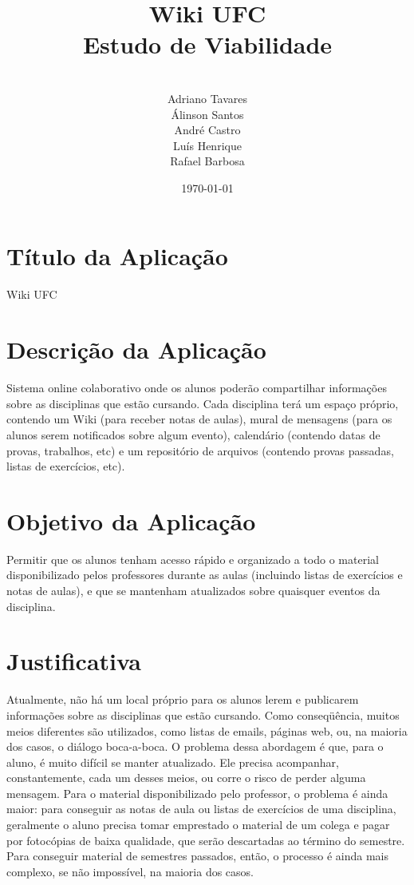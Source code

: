 \documentclass[11pt]{article}
\title{\vspace{8em} \huge{Wiki UFC} \\ \vspace{0.1em} \small{Estudo de Viabilidade}}
\author{
        \vspace{5em} \\
        \small{Adriano Tavares} \\
        \small{Álinson Santos}  \\
        \small{André Castro}    \\
        \small{Luís Henrique}   \\
        \small{Rafael Barbosa}
}
\date{\today}
\begin{document}
\maketitle
\pagebreak

\tableofcontents
\pagebreak

\section{Título da Aplicação}

Wiki UFC

\section{Descrição da Aplicação}

Sistema online colaborativo onde os alunos poderão compartilhar informações sobre
as disciplinas que estão cursando. Cada disciplina terá um espaço próprio, contendo
um Wiki (para receber notas de aulas), mural de mensagens (para os alunos serem
notificados sobre algum evento), calendário (contendo datas de provas, trabalhos, etc)
e um repositório de arquivos (contendo provas passadas, listas de exercícios, etc).



\section{Objetivo da Aplicação}

Permitir que os alunos tenham acesso rápido e organizado a todo o material
disponibilizado pelos professores durante as aulas (incluindo listas de exercícios e
notas de aulas), e que se mantenham atualizados sobre quaisquer eventos da
disciplina.



\section{Justificativa}

Atualmente, não há um local próprio para os alunos lerem e publicarem informações
sobre as disciplinas que estão cursando. Como conseqüência, muitos meios diferentes
são utilizados, como listas de emails, páginas web, ou, na maioria dos casos, o diálogo
boca-a-boca. O problema dessa abordagem é que, para o aluno, é muito difícil se
manter atualizado. Ele precisa acompanhar, constantemente, cada um desses meios,
ou corre o risco de perder alguma mensagem.
Para o material disponibilizado pelo professor, o problema é ainda maior: para
conseguir as notas de aula ou listas de exercícios de uma disciplina, geralmente o
aluno precisa tomar emprestado o material de um colega e pagar por fotocópias de
baixa qualidade, que serão descartadas ao término do semestre. Para conseguir
material de semestres passados, então, o processo é ainda mais complexo, se não
impossível, na maioria dos casos.
\end{document}
